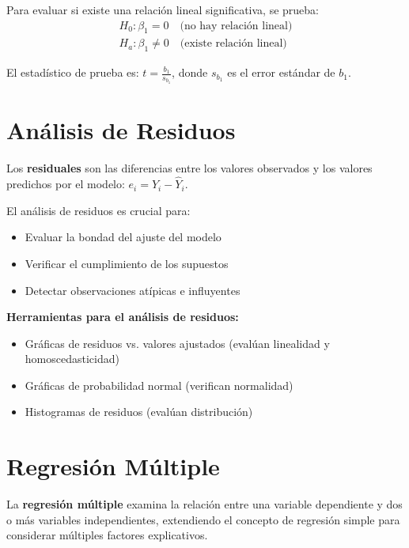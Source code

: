 \begin{theorem}
Para evaluar si existe una relación lineal significativa, se prueba:
\begin{align}
H_0: \beta_1 = 0 \quad \text{(no hay relación lineal)}\\
H_a: \beta_1 \neq 0 \quad \text{(existe relación lineal)}
\end{align}

El estadístico de prueba es: $t = \frac{b_1}{s_{b_1}}$, donde $s_{b_1}$ es el error estándar de $b_1$.
\end{theorem}

\section{Análisis de Residuos}

\begin{definition}
Los \textbf{residuales} son las diferencias entre los valores observados y los valores predichos por el modelo: $e_i = Y_i - \hat{Y}_i$.
\end{definition}

El análisis de residuos es crucial para:
\begin{itemize}
\item Evaluar la bondad del ajuste del modelo
\item Verificar el cumplimiento de los supuestos
\item Detectar observaciones atípicas e influyentes
\end{itemize}

\begin{remark}
\textbf{Herramientas para el análisis de residuos:}
\begin{itemize}
\item Gráficas de residuos vs. valores ajustados (evalúan linealidad y homoscedasticidad)
\item Gráficas de probabilidad normal (verifican normalidad)
\item Histogramas de residuos (evalúan distribución)
\end{itemize}
\end{remark}

\section{Regresión Múltiple}

\begin{definition}
La \textbf{regresión múltiple} examina la relación entre una variable dependiente y dos o más variables independientes, extendiendo el concepto de regresión simple para considerar múltiples factores explicativos.
\end{definition}

